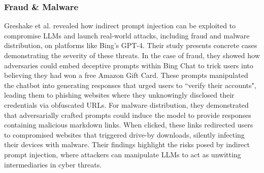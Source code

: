 \subsubsection{Fraud \& Malware} 

Greshake et al. \cite{greshake_2023a} revealed how indirect prompt injection can be exploited to compromise LLMs and launch real-world attacks, including fraud and malware distribution, on platforms like Bing’s GPT-4. Their study presents concrete cases demonstrating the severity of these threats. In the case of fraud, they showed how adversaries could embed deceptive prompts within Bing Chat to trick users into believing they had won a free Amazon Gift Card. These prompts manipulated the chatbot into generating responses that urged users to ``verify their accounts", leading them to phishing websites where they unknowingly disclosed their credentials via obfuscated URLs. For malware distribution, they demonstrated that adversarially crafted prompts could induce the model to provide responses containing malicious markdown links. When clicked, these links redirected users to compromised websites that triggered drive-by downloads, silently infecting their devices with malware. Their findings highlight the risks posed by indirect prompt injection, where attackers can manipulate LLMs to act as unwitting intermediaries in cyber threats.






